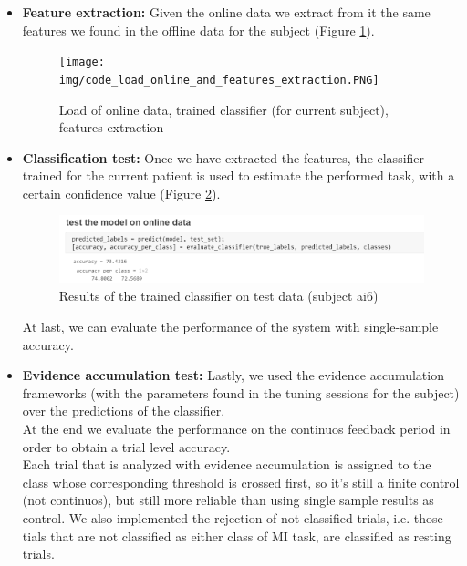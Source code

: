 \begin{itemize}
\item \textbf{Feature extraction:} Given the online data we extract from it the same features we found in the offline data for the subject (Figure \ref{fig:load_online_data_classifier_features_extraction}). 

\begin{figure}[h!]
	\begin{center}
		 \texttt{[image: img/code\_load\_online\_and\_features\_extraction.PNG]}
	\end{center}

	 \caption{Load of online data, trained classifier (for current subject), features  extraction}
	 \label{fig:load_online_data_classifier_features_extraction}
\end{figure}



\item \textbf{Classification test:} Once we have extracted the features, the classifier trained for the current patient is used to estimate the performed task, with a certain confidence value (Figure \ref{fig:test_results_ai6}). \\

\begin{figure}[h!]
	\begin{center}
		 \includegraphics[width=0.7\linewidth]{img/code_test_set_results_ai6.PNG}
	\end{center}

	 \caption{Results of the trained classifier on test data (subject ai6)}
	 \label{fig:test_results_ai6}
\end{figure}

At last, we can evaluate the performance of the system with single-sample accuracy.
\item \textbf{Evidence accumulation test:} Lastly, we used the evidence accumulation frameworks (with the parameters found in the tuning sessions for the subject) over the predictions of the classifier.\\
At the end we evaluate the performance on the continuos feedback period in order to obtain a trial level accuracy. \\
Each trial that is analyzed with evidence accumulation is assigned to the class whose corresponding threshold is crossed first, so it's still a finite control (not continuos), but still more reliable than using single sample results as control. We also implemented the rejection of not classified trials, i.e. those tials that are not classified as either class of MI task, are classified as resting trials.
\end{itemize}




